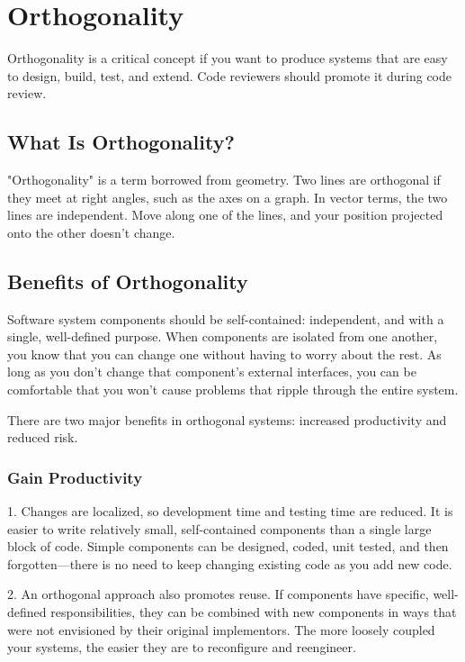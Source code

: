 
\chapter{Orthogonality}

Orthogonality is a critical concept if you want to produce systems that are easy to design, build, test, and extend. Code reviewers should promote it during code review.

\section{What Is Orthogonality?}

"Orthogonality" is a term borrowed from geometry. Two lines are orthogonal if they meet at right angles, such as the axes on a graph. In vector terms, the two lines are independent. Move along one of the lines, and your position projected onto the other doesn't change.

\section{Benefits of Orthogonality}

Software system components should be  self-contained: independent, and with a single, well-defined purpose. When components are isolated from one another, you know that you can change one without having to worry about the rest. As long as you don’t change that component’s external interfaces, you can be comfortable that you won’t cause problems that ripple through the entire system.

There are two major benefits in orthogonal systems: increased productivity and reduced risk.

\subsection{Gain Productivity}

1. Changes are localized, so development time and testing time are reduced. It is easier to write relatively small, self-contained components than a single large block of code. Simple components can be designed, coded, unit tested, and then forgotten—there is no need to keep changing existing code as you add new code.

2. An orthogonal approach also promotes reuse. If components have specific, well-defined responsibilities, they can be combined with new components in ways that were not envisioned by their original implementors. The more loosely coupled your systems, the easier they are to reconfigure and reengineer.

